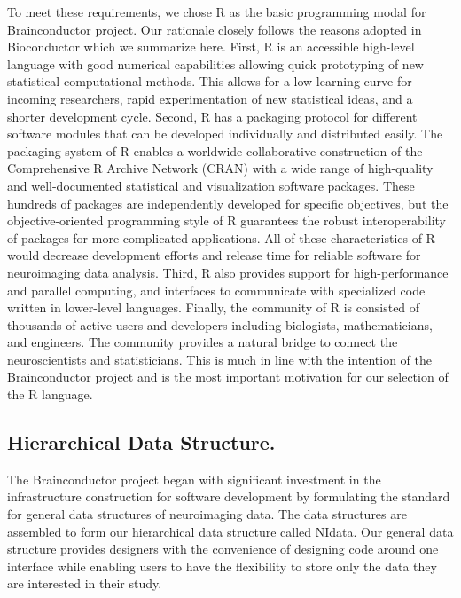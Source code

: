 \documentclass{nature}
\begin{document}
To meet these requirements, we chose R as the basic programming
modal for Brainconductor project. Our rationale closely follows
the reasons adopted in Bioconductor which we summarize
here\cite{gentleman2004bioconductor}.
First, R is an accessible high-level language with
good numerical capabilities allowing quick prototyping of new statistical
computational methods. This allows for a low learning curve for
incoming researchers, rapid experimentation of
new statistical ideas, and a shorter development cycle.
Second, R has a packaging protocol for different software
modules that can be developed individually and distributed easily. The
packaging system of R enables a worldwide collaborative construction of the
Comprehensive R Archive Network (CRAN) with a wide range of
high-quality and well-documented statistical and visualization software
packages. These hundreds of packages are independently developed for specific
objectives, but the objective-oriented programming style of R guarantees the
robust interoperability of packages for more complicated applications. All of
these characteristics of R would decrease development efforts and release time
for reliable software for neuroimaging data analysis.
Third, R also provides
support for high-performance\cite{buckner2010gputools} and parallel
computing\cite{schmidberger2009state},
and interfaces to communicate with specialized code
written in lower-level languages.
Finally, the community of R is
consisted of thousands of active users and developers including biologists,
mathematicians, and engineers. The community provides a natural bridge to
connect the neuroscientists and statisticians. This is much in line with the
intention of the Brainconductor project and is the most important motivation for
our selection of the R language.


\subsection{Hierarchical Data Structure.} The Brainconductor
project began with significant investment in the infrastructure construction for
software development by formulating the standard for general data structures of
neuroimaging data.
The data structures are assembled to form our hierarchical
data structure called NIdata.
Our general data structure provides designers with the 
convenience of designing code around one interface
while enabling users to have the flexibility to store
only the data they are interested in their study.
\end{document}
